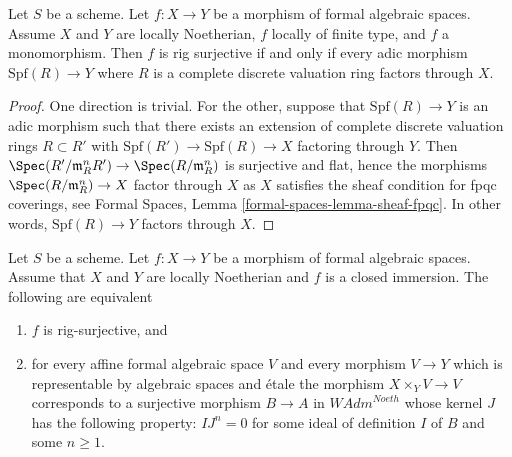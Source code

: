 \begin{lemma}
\label{lemma-monomorphism-rig-surjective}
Let $S$ be a scheme. Let $f : X \to Y$ be a morphism of formal algebraic
spaces. Assume $X$ and $Y$ are locally Noetherian, $f$ locally of finite
type, and $f$ a monomorphism. Then $f$ is rig surjective if and only if
every adic morphism $\text{Spf}(R) \to Y$ where $R$ is a complete discrete
valuation ring factors through $X$.
\end{lemma}

\begin{proof}
One direction is trivial. For the other, suppose that $\text{Spf}(R) \to Y$
is an adic morphism such that there exists an extension of complete
discrete valuation rings $R \subset R'$ with
$\text{Spf}(R') \to \text{Spf}(R) \to X$ factoring through $Y$. Then
$\Spec(R'/\mathfrak m_R^n R') \to \Spec(R/\mathfrak m_R^n)$ is surjective
and flat, hence the morphisms $\Spec(R/\mathfrak m_R^n) \to X$ factor
through $X$ as $X$ satisfies the sheaf condition for fpqc coverings, see
Formal Spaces, Lemma \ref{formal-spaces-lemma-sheaf-fpqc}.
In other words, $\text{Spf}(R) \to Y$ factors through $X$.
\end{proof}

\begin{lemma}
\label{lemma-closed-immersion-rig-surjective}
Let $S$ be a scheme. Let $f : X \to Y$ be a morphism of formal algebraic
spaces. Assume that $X$ and $Y$ are locally Noetherian and $f$ is a
closed immersion. The following are equivalent
\begin{enumerate}
\item $f$ is rig-surjective, and
\item for every affine formal algebraic space $V$ and every morphism
$V \to Y$ which is representable by algebraic spaces and \'etale
the morphism $X \times_Y V \to V$ corresponds to a surjective morphism
$B \to A$ in $\textit{WAdm}^{Noeth}$ whose kernel $J$ has the following
property: $IJ^n = 0$ for some ideal of definition $I$ of $B$
and some $n \geq 1$.
\end{enumerate}
\end{lemma}

